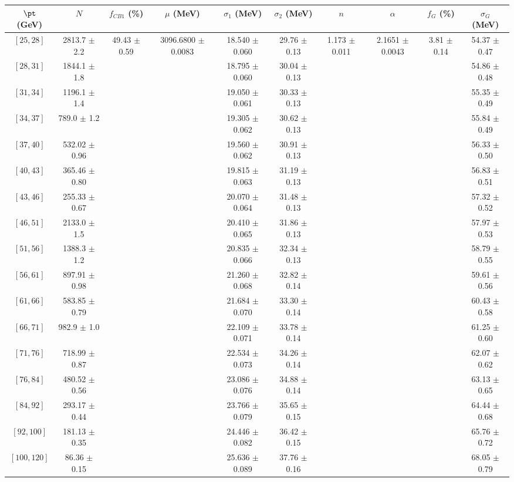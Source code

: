 \begin{tabular}{c||c|c|c|c|c|c|c|c|c}
$\pt$ (GeV) & $N$ & $f_{CB1}$ (\%)  & $\mu$ (MeV) & $\sigma_1$ (MeV) & $\sigma_2$ (MeV) & $n$ & $\alpha$ & $f_G$ (\%) & $\sigma_G$ (MeV) \\
\hline
$[25, 28]$ & 2813.7 $\pm$ 2.2 & \multirow{17}{*}{49.43 $\pm$ 0.59} & \multirow{17}{*}{3096.6800 $\pm$ 0.0083} & 18.540 $\pm$ 0.060 & 29.76 $\pm$ 0.13 & \multirow{17}{*}{1.173 $\pm$ 0.011} & \multirow{17}{*}{2.1651 $\pm$ 0.0043} & \multirow{17}{*}{3.81 $\pm$ 0.14} & 54.37 $\pm$ 0.47\\
$[28, 31]$ & 1844.1 $\pm$ 1.8 &  &  & 18.795 $\pm$ 0.060 & 30.04 $\pm$ 0.13 &  &  &  & 54.86 $\pm$ 0.48\\
$[31, 34]$ & 1196.1 $\pm$ 1.4 &  &  & 19.050 $\pm$ 0.061 & 30.33 $\pm$ 0.13 &  &  &  & 55.35 $\pm$ 0.49\\
$[34, 37]$ & 789.0 $\pm$ 1.2 &  &  & 19.305 $\pm$ 0.062 & 30.62 $\pm$ 0.13 &  &  &  & 55.84 $\pm$ 0.49\\
$[37, 40]$ & 532.02 $\pm$ 0.96 &  &  & 19.560 $\pm$ 0.062 & 30.91 $\pm$ 0.13 &  &  &  & 56.33 $\pm$ 0.50\\
$[40, 43]$ & 365.46 $\pm$ 0.80 &  &  & 19.815 $\pm$ 0.063 & 31.19 $\pm$ 0.13 &  &  &  & 56.83 $\pm$ 0.51\\
$[43, 46]$ & 255.33 $\pm$ 0.67 &  &  & 20.070 $\pm$ 0.064 & 31.48 $\pm$ 0.13 &  &  &  & 57.32 $\pm$ 0.52\\
$[46, 51]$ & 2133.0 $\pm$ 1.5 &  &  & 20.410 $\pm$ 0.065 & 31.86 $\pm$ 0.13 &  &  &  & 57.97 $\pm$ 0.53\\
$[51, 56]$ & 1388.3 $\pm$ 1.2 &  &  & 20.835 $\pm$ 0.066 & 32.34 $\pm$ 0.13 &  &  &  & 58.79 $\pm$ 0.55\\
$[56, 61]$ & 897.91 $\pm$ 0.98 &  &  & 21.260 $\pm$ 0.068 & 32.82 $\pm$ 0.14 &  &  &  & 59.61 $\pm$ 0.56\\
$[61, 66]$ & 583.85 $\pm$ 0.79 &  &  & 21.684 $\pm$ 0.070 & 33.30 $\pm$ 0.14 &  &  &  & 60.43 $\pm$ 0.58\\
$[66, 71]$ & 982.9 $\pm$ 1.0 &  &  & 22.109 $\pm$ 0.071 & 33.78 $\pm$ 0.14 &  &  &  & 61.25 $\pm$ 0.60\\
$[71, 76]$ & 718.99 $\pm$ 0.87 &  &  & 22.534 $\pm$ 0.073 & 34.26 $\pm$ 0.14 &  &  &  & 62.07 $\pm$ 0.62\\
$[76, 84]$ & 480.52 $\pm$ 0.56 &  &  & 23.086 $\pm$ 0.076 & 34.88 $\pm$ 0.14 &  &  &  & 63.13 $\pm$ 0.65\\
$[84, 92]$ & 293.17 $\pm$ 0.44 &  &  & 23.766 $\pm$ 0.079 & 35.65 $\pm$ 0.15 &  &  &  & 64.44 $\pm$ 0.68\\
$[92, 100]$ & 181.13 $\pm$ 0.35 &  &  & 24.446 $\pm$ 0.082 & 36.42 $\pm$ 0.15 &  &  &  & 65.76 $\pm$ 0.72\\
$[100, 120]$ & 86.36 $\pm$ 0.15 &  &  & 25.636 $\pm$ 0.089 & 37.76 $\pm$ 0.16 &  &  &  & 68.05 $\pm$ 0.79\\
\end{tabular}
